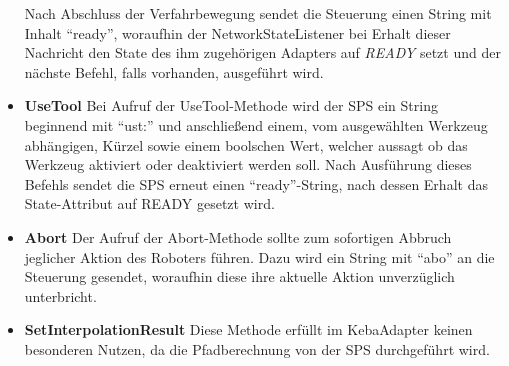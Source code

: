 \begin{itemize}
Nach Abschluss der Verfahrbewegung sendet die Steuerung einen String mit Inhalt “ready”, woraufhin der NetworkStateListener bei Erhalt dieser Nachricht den State des ihm zugehörigen Adapters auf \textit{READY} setzt und der nächste Befehl, falls vorhanden, ausgeführt wird.
\item \textbf{UseTool}
\newline
Bei Aufruf der UseTool-Methode wird der SPS ein String beginnend mit “ust:” und anschließend einem, vom ausgewählten Werkzeug abhängigen, Kürzel sowie einem boolschen Wert, welcher aussagt ob das Werkzeug aktiviert oder deaktiviert werden soll. Nach Ausführung dieses Befehls sendet die SPS erneut einen “ready”-String, nach dessen Erhalt das State-Attribut auf READY gesetzt wird. 
\item \textbf{Abort}
\newline
Der Aufruf der Abort-Methode sollte zum sofortigen Abbruch jeglicher Aktion des Roboters führen. Dazu wird ein String mit “abo” an die Steuerung gesendet, woraufhin diese ihre aktuelle Aktion unverzüglich unterbricht. 
\item \textbf{SetInterpolationResult}
\newline
Diese Methode erfüllt im KebaAdapter keinen besonderen Nutzen, da die Pfadberechnung von der SPS durchgeführt wird.
\end{itemize}